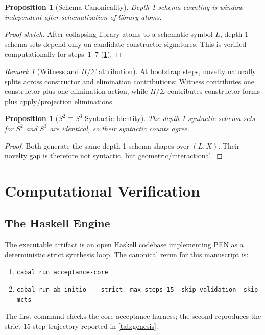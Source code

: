 \documentclass[11pt,a4paper]{article}
\theoremstyle{plain}
\newtheorem{proposition}[theorem]{Proposition}
\theoremstyle{definition}
\theoremstyle{remark}
\newtheorem{remark}[theorem]{Remark}
\begin{document}
\begin{proposition}[Schema Canonicality]
\label{prop:grammar-canonical}
Depth-1 schema counting is window-independent after schematization of library atoms.
\end{proposition}

\begin{proof}[Proof sketch]
After collapsing library atoms to a schematic symbol $L$, depth-1 schema sets depend only on candidate constructor signatures.
This is verified computationally for steps~1--7 (\cref{sec:verification}).
\end{proof}

\begin{remark}[Witness and $\Pi/\Sigma$ attribution]
\label{rem:witness-pisigma-attribution}
At bootstrap steps, novelty naturally splits across constructor and elimination contributions:
Witness contributes one constructor plus one elimination action, while $\Pi/\Sigma$ contributes constructor forms plus apply/projection eliminations.
\end{remark}

\begin{proposition}[$S^2 \equiv S^3$ Syntactic Identity]
\label{prop:s2s3}
The depth-1 syntactic schema sets for $S^2$ and $S^3$ are identical, so their syntactic counts agree.
\end{proposition}

\begin{proof}
Both generate the same depth-1 schema shapes over $(L,X)$.
Their novelty gap is therefore not syntactic, but geometric/interactional.
\end{proof}
\section{Computational Verification}
\label{sec:verification}

\subsection{The Haskell Engine}

The executable artifact is an open Haskell codebase implementing PEN as a deterministic strict synthesis loop.
The canonical rerun for this manuscript is:
\begin{enumerate}[nosep]
    \item \texttt{cabal run acceptance-core}
    \item \texttt{cabal run ab-initio -- --strict --max-steps 15 --skip-validation --skip-mcts}
\end{enumerate}
The first command checks the core acceptance harness; the second reproduces the strict 15-step trajectory reported in \cref{tab:genesis}.
\end{document}
